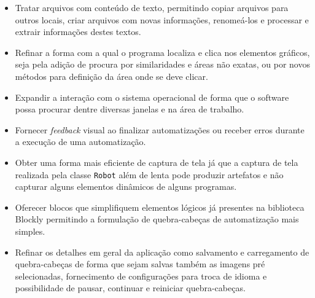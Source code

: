\documentclass[tg]{mdtufsm}
\begin{document}
            \begin{itemize}
            	\item Tratar arquivos com conteúdo de texto, permitindo copiar arquivos para outros locais, criar arquivos com novas informações, renomeá-los e processar e extrair informações destes textos.
                \item Refinar a forma com a qual o programa localiza e clica nos elementos gráficos, seja pela adição de procura por similaridades e áreas não exatas, ou por novos métodos para definição da área onde se deve clicar.
                \item Expandir a interação com o sistema operacional de forma que o software possa procurar dentre diversas janelas e na área de trabalho.
            	\item Fornecer \emph{feedback} visual ao finalizar automatizações ou receber erros durante a execução de uma automatização.
            	\item Obter uma forma mais eficiente de captura de tela já que a captura de tela realizada pela classe \texttt{Robot} além de lenta pode produzir artefatos e não capturar alguns elementos dinâmicos de alguns programas.
                \item Oferecer blocos que simplifiquem elementos lógicos já presentes na biblioteca Blockly permitindo a formulação de quebra-cabeças de automatização mais simples.
                \item Refinar os detalhes em geral da aplicação como salvamento e carregamento de quebra-cabeças de forma que sejam salvas também as imagens pré selecionadas, fornecimento de configurações para troca de idioma e possibilidade de pausar, continuar e reiniciar quebra-cabeças.
            \end{itemize}

	\setlength{\baselineskip}{\baselineskip}
	
	
\end{document}
